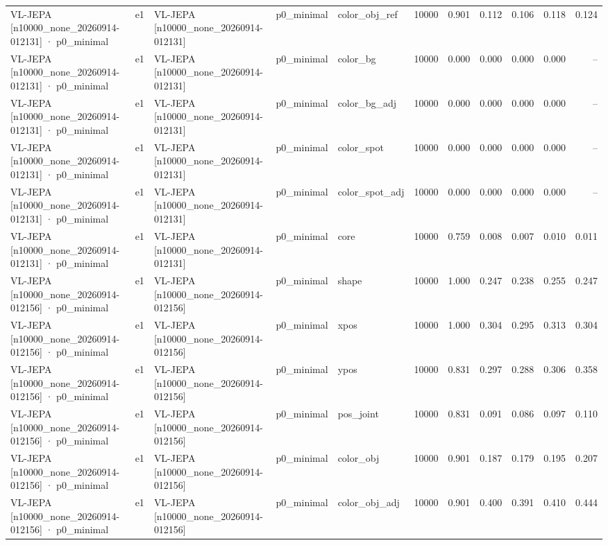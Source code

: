 \begin{tabular}{lllllrrrrrr}
VL-JEPA [n10000\_none\_20260914-012131] · p0\_minimal & e1 & VL-JEPA [n10000\_none\_20260914-012131] & p0\_minimal & color\_obj\_ref & 10000 & 0.901 & 0.112 & 0.106 & 0.118 & 0.124 \\
VL-JEPA [n10000\_none\_20260914-012131] · p0\_minimal & e1 & VL-JEPA [n10000\_none\_20260914-012131] & p0\_minimal & color\_bg & 10000 & 0.000 & 0.000 & 0.000 & 0.000 & -- \\
VL-JEPA [n10000\_none\_20260914-012131] · p0\_minimal & e1 & VL-JEPA [n10000\_none\_20260914-012131] & p0\_minimal & color\_bg\_adj & 10000 & 0.000 & 0.000 & 0.000 & 0.000 & -- \\
VL-JEPA [n10000\_none\_20260914-012131] · p0\_minimal & e1 & VL-JEPA [n10000\_none\_20260914-012131] & p0\_minimal & color\_spot & 10000 & 0.000 & 0.000 & 0.000 & 0.000 & -- \\
VL-JEPA [n10000\_none\_20260914-012131] · p0\_minimal & e1 & VL-JEPA [n10000\_none\_20260914-012131] & p0\_minimal & color\_spot\_adj & 10000 & 0.000 & 0.000 & 0.000 & 0.000 & -- \\
VL-JEPA [n10000\_none\_20260914-012131] · p0\_minimal & e1 & VL-JEPA [n10000\_none\_20260914-012131] & p0\_minimal & core & 10000 & 0.759 & 0.008 & 0.007 & 0.010 & 0.011 \\
VL-JEPA [n10000\_none\_20260914-012156] · p0\_minimal & e1 & VL-JEPA [n10000\_none\_20260914-012156] & p0\_minimal & shape & 10000 & 1.000 & 0.247 & 0.238 & 0.255 & 0.247 \\
VL-JEPA [n10000\_none\_20260914-012156] · p0\_minimal & e1 & VL-JEPA [n10000\_none\_20260914-012156] & p0\_minimal & xpos & 10000 & 1.000 & 0.304 & 0.295 & 0.313 & 0.304 \\
VL-JEPA [n10000\_none\_20260914-012156] · p0\_minimal & e1 & VL-JEPA [n10000\_none\_20260914-012156] & p0\_minimal & ypos & 10000 & 0.831 & 0.297 & 0.288 & 0.306 & 0.358 \\
VL-JEPA [n10000\_none\_20260914-012156] · p0\_minimal & e1 & VL-JEPA [n10000\_none\_20260914-012156] & p0\_minimal & pos\_joint & 10000 & 0.831 & 0.091 & 0.086 & 0.097 & 0.110 \\
VL-JEPA [n10000\_none\_20260914-012156] · p0\_minimal & e1 & VL-JEPA [n10000\_none\_20260914-012156] & p0\_minimal & color\_obj & 10000 & 0.901 & 0.187 & 0.179 & 0.195 & 0.207 \\
VL-JEPA [n10000\_none\_20260914-012156] · p0\_minimal & e1 & VL-JEPA [n10000\_none\_20260914-012156] & p0\_minimal & color\_obj\_adj & 10000 & 0.901 & 0.400 & 0.391 & 0.410 & 0.444 \\

\end{tabular}
